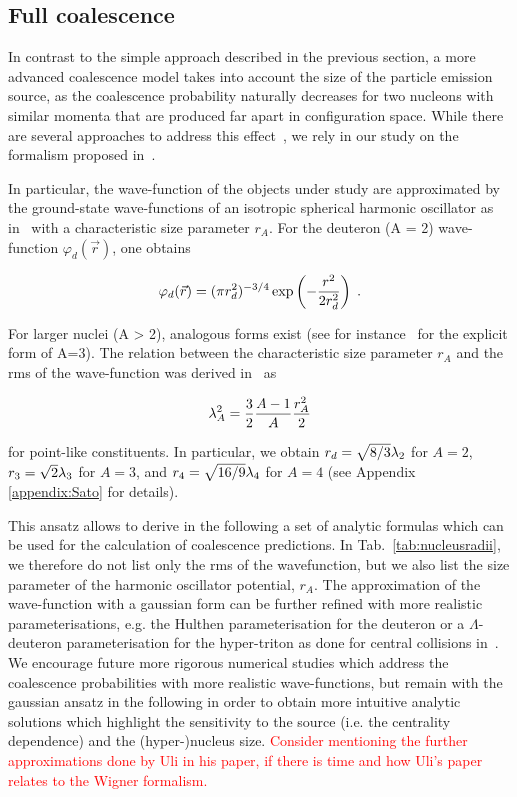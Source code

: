 \documentclass[a4paper,11pt]{scrartcl} %
\begin{document}
\subsection{Full coalescence}
\label{subsec:FullCoalescence}

In contrast to the simple approach described in the previous section, a more advanced coalescence model takes into account the size of the particle emission source, as the coalescence probability naturally decreases for two nucleons with similar momenta that are produced far apart in configuration space. While there are several approaches to address this effect~\cite{Sato:1981ez, Nagle:1996vp, Bergstrom:1979gpv}, we rely in our study on the formalism proposed in~\cite{Scheibl:1998tk}. 

In particular, the wave-function of the objects under study are approximated by the ground-state wave-functions of an isotropic spherical harmonic oscillator as in~\cite{Scheibl:1998tk} with a characteristic size parameter $r_{A}$. For the deuteron (A = 2) wave-function $\varphi_{d}(\vec{r}) $, one obtains

\begin{equation}\label{eq:WaveHeinz}
 \varphi_{d}(\vec{r}) = (\pi r_{d}^2)^{-3/4} \exp\left(-{r^2 \over 2 r_{d}^2}\right) \;.
\end{equation}

\noindent For larger nuclei (A > 2), analogous forms exist (see for instance~\cite{Scheibl:1998tk} for the explicit form of A=3). The relation between the characteristic size parameter $r_{A}$ and the rms of the wave-function was derived in~\cite{Shebeko:2006ud} as

\begin{equation}
 \lambda_{A}^2 = {3 \over 2}{A - 1 \over A} {r_{A}^2 \over 2}
\end{equation}

\noindent for point-like constituents. In particular, we obtain $r_{d}= \sqrt{8/3}  \lambda_{2}$ for $A = 2$, $r_{3}= \sqrt{2}{\lambda_{3}}$ for $A = 3$, and  $r_{4}= \sqrt{16/9} \lambda_{4}$ for $A=4$ (see Appendix \ref{appendix:Sato} for details).

This ansatz allows to derive in the following a set of analytic formulas which can be used for the calculation of coalescence predictions. In Tab.~\ref{tab:nucleusradii}, we therefore do not list only the rms of the wavefunction, but we also list the size parameter of the harmonic oscillator potential, $r_{A}$. The approximation of the wave-function with a gaussian form can be further refined with more realistic parameterisations, e.g. the Hulthen parameterisation for the deuteron or a $\Lambda$-deuteron parameterisation for the hyper-triton as done for central collisions in~\cite{Zhang:2018euf}. We encourage future more rigorous numerical studies which address the coalescence probabilities with more realistic wave-functions, but remain with the gaussian ansatz in the following in order to obtain more intuitive analytic solutions which highlight the sensitivity to the source (i.e. the centrality dependence) and the (hyper-)nucleus size. \textcolor{red}{Consider mentioning the further  approximations done by Uli in his paper, if there is time and how Uli's paper relates to the Wigner formalism.}
\end{document}
